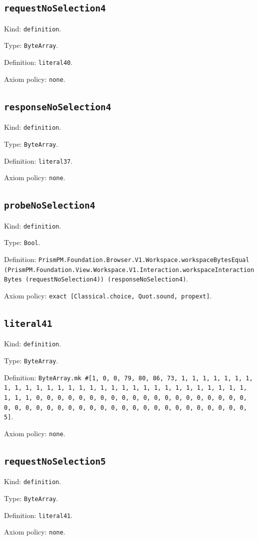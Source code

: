 \documentclass[11pt]{article}
\begin{document}
\subsection*{\texttt{requestNoSelection4}}
\noindent Kind: \texttt{definition}.\par
\noindent Type: \texttt{ByteArray}.\par
\noindent Definition: \texttt{literal40}.\par
\noindent Axiom policy: \texttt{none}.\par
\subsection*{\texttt{responseNoSelection4}}
\noindent Kind: \texttt{definition}.\par
\noindent Type: \texttt{ByteArray}.\par
\noindent Definition: \texttt{literal37}.\par
\noindent Axiom policy: \texttt{none}.\par
\subsection*{\texttt{probeNoSelection4}}
\noindent Kind: \texttt{definition}.\par
\noindent Type: \texttt{Bool}.\par
\noindent Definition: \texttt{PrismPM.Foundation.Browser.V1.Workspace.workspaceBytesEqual (PrismPM.Foundation.View.Workspace.V1.Interaction.workspaceInteractionBytes (requestNoSelection4)) (responseNoSelection4)}.\par
\noindent Axiom policy: \texttt{exact [Classical.choice, Quot.sound, propext]}.\par
\subsection*{\texttt{literal41}}
\noindent Kind: \texttt{definition}.\par
\noindent Type: \texttt{ByteArray}.\par
\noindent Definition: \texttt{ByteArray.mk \#[1, 0, 0, 79, 80, 86, 73, 1, 1, 1, 1, 1, 1, 1, 1, 1, 1, 1, 1, 1, 1, 1, 1, 1, 1, 1, 1, 1, 1, 1, 1, 1, 1, 1, 1, 1, 1, 1, 1, 1, 0, 0, 0, 0, 0, 0, 0, 0, 0, 0, 0, 0, 0, 0, 0, 0, 0, 0, 0, 0, 0, 0, 0, 0, 0, 0, 0, 0, 0, 0, 0, 0, 0, 0, 0, 0, 0, 0, 0, 0, 0, 0, 0, 5]}.\par
\noindent Axiom policy: \texttt{none}.\par
\subsection*{\texttt{requestNoSelection5}}
\noindent Kind: \texttt{definition}.\par
\noindent Type: \texttt{ByteArray}.\par
\noindent Definition: \texttt{literal41}.\par
\noindent Axiom policy: \texttt{none}.\par
\end{document}
